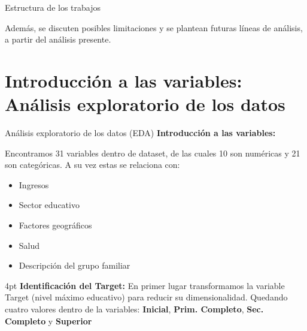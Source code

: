 \documentclass[pdf]{beamer}
\def\vspace{}%
\begin{document}
{\begin{frame}{Estructura de los trabajos}
\begin{enumerate}
        Además, se discuten posibles limitaciones y se plantean futuras líneas de análisis, a partir del análisis presente.

    \end{enumerate}

\end{frame}

\section{Introducción a las variables: Análisis exploratorio de los datos}

\begin{frame}{Análisis exploratorio de los datos (EDA)}
\textbf{Introducción a las variables:}

Encontramos 31 variables dentro de dataset, de las cuales 10 son numéricas y 21 son categóricas. A su vez estas se relaciona con:
\begin{itemize} 
    \item Ingresos
    \item Sector educativo
    \item Factores geográficos
    \item Salud
    \item Descripción del grupo familiar
\end{itemize}
 \vspace{4pt}
 \textbf{Identificación del Target:} En primer lugar transformamos la variable Target (nivel máximo educativo) para reducir su dimensionalidad. Quedando cuatro valores dentro de la variables:  \textbf{Inicial}, \textbf{Prim. Completo}, \textbf{Sec. Completo} y \textbf{Superior}
\end{frame}
 
}
\end{document}
